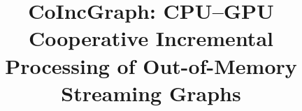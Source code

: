 \documentclass[conference]{IEEEtran}
\begin{document}
\title{CoIncGraph: CPU--GPU Cooperative Incremental Processing of Out-of-Memory Streaming Graphs} %
\author{}
\maketitle












{}
\end{document}
